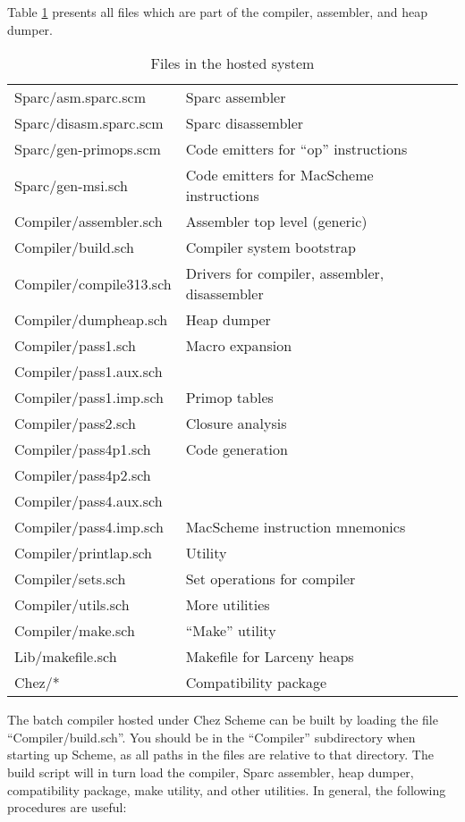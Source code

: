 Table \ref{files} presents all files which are part of the compiler,
assembler, and heap dumper.

\begin{table}[hbt]
\begin{center}
\begin{tabular}{|l|l|} \hline
Sparc/asm.sparc.scm       & Sparc assembler \\
Sparc/disasm.sparc.scm    & Sparc disassembler \\
Sparc/gen-primops.scm     & Code emitters for ``op'' instructions \\
Sparc/gen-msi.sch         & Code emitters for MacScheme instructions \\
Compiler/assembler.sch    & Assembler top level (generic) \\
Compiler/build.sch        & Compiler system bootstrap \\
Compiler/compile313.sch   & Drivers for compiler, assembler, disassembler \\
Compiler/dumpheap.sch     & Heap dumper \\
Compiler/pass1.sch        & Macro expansion \\
Compiler/pass1.aux.sch    & \\
Compiler/pass1.imp.sch    & Primop tables \\
Compiler/pass2.sch        & Closure analysis \\
Compiler/pass4p1.sch      & Code generation \\
Compiler/pass4p2.sch      & \\
Compiler/pass4.aux.sch    & \\
Compiler/pass4.imp.sch    & MacScheme instruction mnemonics \\
Compiler/printlap.sch     & Utility \\
Compiler/sets.sch         & Set operations for compiler \\
Compiler/utils.sch        & More utilities \\
Compiler/make.sch         & ``Make'' utility \\
Lib/makefile.sch          & Makefile for Larceny heaps \\
Chez/*                    & Compatibility package \\ \hline
\end{tabular}
\end{center}
\caption{Files in the hosted system}
\label{files}
\end{table}

The batch compiler hosted under Chez Scheme can be built by loading
the file ``Compiler/build.sch''. You should be in the ``Compiler''
subdirectory when starting up Scheme, as all paths in the files are
relative to that directory. The build script will in turn load the
compiler, Sparc assembler, heap dumper, compatibility package, make
utility, and other utilities. In general, the following procedures are
useful:


